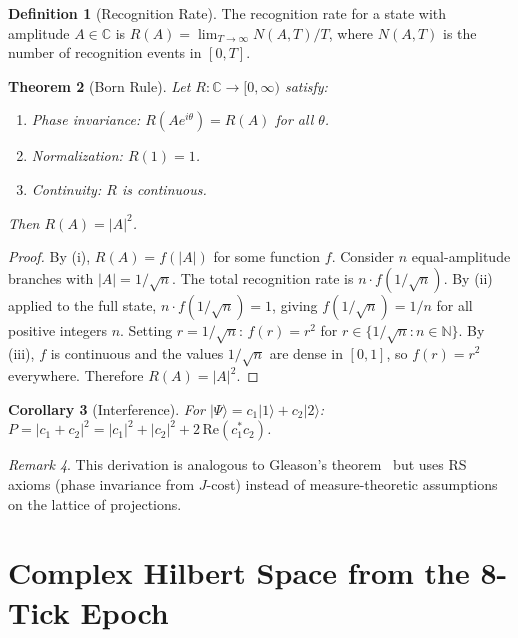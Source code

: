 \documentclass[12pt,a4paper]{article}
\newtheorem{theorem}{Theorem}[section]
\newtheorem{corollary}[theorem]{Corollary}
\theoremstyle{definition}
\newtheorem{definition}[theorem]{Definition}
\theoremstyle{remark}
\newtheorem{remark}[theorem]{Remark}
\begin{document}
\begin{definition}[Recognition Rate]
The recognition rate for a state with amplitude $A \in \mathbb{C}$
is $R(A) = \lim_{T \to \infty} N(A, T)/T$, where $N(A, T)$ is
the number of recognition events in $[0, T]$.
\end{definition}

\begin{theorem}[Born Rule]
\label{thm:born}
Let $R: \mathbb{C} \to [0, \infty)$ satisfy:
\begin{enumerate}[label=(\roman*),nosep]
  \item Phase invariance: $R(Ae^{i\theta}) = R(A)$ for all
  $\theta$.
  \item Normalization: $R(1) = 1$.
  \item Continuity: $R$ is continuous.
\end{enumerate}
Then $R(A) = |A|^2$.
\end{theorem}

\begin{proof}
By (i), $R(A) = f(|A|)$ for some function $f$.  Consider $n$
equal-amplitude branches with $|A| = 1/\sqrt{n}$.  The total
recognition rate is $n \cdot f(1/\sqrt{n})$.  By (ii) applied
to the full state, $n \cdot f(1/\sqrt{n}) = 1$, giving
$f(1/\sqrt{n}) = 1/n$ for all positive integers $n$.  Setting
$r = 1/\sqrt{n}$: $f(r) = r^2$ for $r \in \{1/\sqrt{n}
: n \in \mathbb{N}\}$.  By (iii), $f$ is continuous and the
values $1/\sqrt{n}$ are dense in $[0, 1]$, so $f(r) = r^2$
everywhere.  Therefore $R(A) = |A|^2$.
\end{proof}

\begin{corollary}[Interference]
For $|\Psi\rangle = c_1|1\rangle + c_2|2\rangle$:
$P = |c_1 + c_2|^2 = |c_1|^2 + |c_2|^2 +
2\,\mathrm{Re}(c_1^* c_2)$.
\end{corollary}

\begin{remark}
This derivation is analogous to Gleason's theorem~\cite{Gleason}
but uses RS axioms (phase invariance from $J$-cost) instead of
measure-theoretic assumptions on the lattice of projections.
\end{remark}

\section{Complex Hilbert Space from the 8-Tick Epoch}
\label{sec:hilbert}
\end{document}
